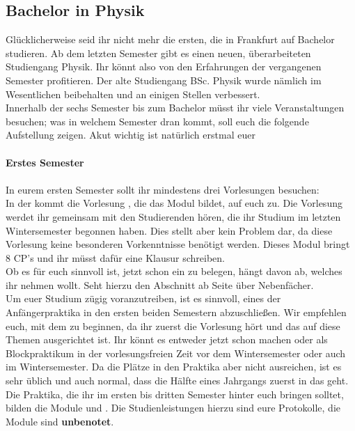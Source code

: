 \subsection{Bachelor in Physik}
\label{subsec:studienstruktur_bsc_physik}
Glücklicherweise seid ihr nicht mehr die ersten, die in Frankfurt auf Bachelor studieren. Ab dem letzten Semester gibt es einen neuen, überarbeiteten Studiengang Physik. Ihr könnt also von den Erfahrungen der vergangenen Semester profitieren. Der alte Studiengang BSc. Physik wurde nämlich im Wesentlichen beibehalten und an einigen Stellen verbessert.\\
Innerhalb der sechs Semester bis zum Bachelor müsst ihr viele Veranstaltungen besuchen; was in welchem Semester dran kommt, soll euch die folgende Aufstellung zeigen. Akut wichtig ist natürlich erstmal euer
\\\\\hspace*{\fill}\textbf{Erstes Semester}\hspace*{\fill}\\\\
In eurem ersten Semester sollt ihr mindestens drei Vorlesungen besuchen:\\
In der  kommt die Vorlesung , die das Modul  bildet, auf euch zu. Die Vorlesung werdet ihr gemeinsam mit den Studierenden hören, die ihr Studium im letzten Wintersemester begonnen haben. Dies stellt aber kein Problem dar, da diese Vorlesung keine besonderen Vorkenntnisse benötigt werden. Dieses Modul bringt 8 CP's und ihr müsst dafür eine Klausur schreiben.\\
Ob es für euch sinnvoll ist, jetzt schon ein  zu belegen,
hängt davon ab, welches ihr nehmen wollt. Seht hierzu den Abschnitt ab Seite \pageref{sec:nebenfach} über Nebenfächer.\\
Um euer Studium zügig voranzutreiben, ist es sinnvoll, eines der Anfängerpraktika in den ersten beiden Semestern abzuschlie\ss en. Wir empfehlen euch, mit dem  zu beginnen, da ihr zuerst die Vorlesung  hört und das  auf diese Themen ausgerichtet ist. Ihr könnt es entweder jetzt schon machen oder als Blockpraktikum in der vorlesungsfreien Zeit vor dem Wintersemester oder auch im Wintersemester. Da die Plätze in den Praktika aber nicht ausreichen, ist es sehr üblich und auch normal, dass die Hälfte eines Jahrgangs zuerst in das  geht. Die Praktika, die ihr im ersten bis dritten Semester hinter euch bringen solltet, bilden die Module  und . Die Studienleistungen hierzu sind eure Protokolle, die Module sind \textbf{unbenotet}.
